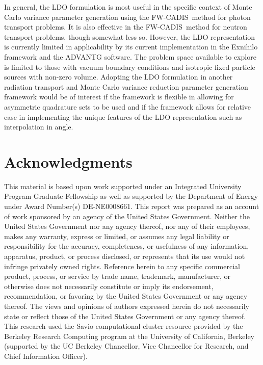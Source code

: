 \documentclass{article} %
\newcommand{\fwc}{\mbox{FW-CADIS}}
\begin{document}
In general, the LDO formulation is most useful in the specific context of
Monte Carlo variance parameter generation using the \fwc\ method for photon
transport problems. It is also effective in the \fwc\ method for neutron
transport problems, though somewhat less so. However, the LDO representation
is currently limited in applicability by its current implementation in the
Exnihilo framework and the ADVANTG software. The problem space available to
explore is limited to those with vacuum boundary conditions and isotropic
fixed particle sources with non-zero volume. Adopting the LDO formulation in
another radiation transport and Monte Carlo variance reduction parameter
generation framework would be of interest if the framework is flexible in
allowing for asymmetric quadrature sets to be used and if the framework allows
for relative ease in implementing the unique features of the LDO
representation such as interpolation in angle.

\pagebreak
\section*{Acknowledgments}

This material is based upon work supported under an Integrated
University Program Graduate Fellowship as well as supported by the Department 
of Energy under Award Number(s) DE-NE0008661. This report was prepared as an
account of work sponsored by an agency of the United States Government.
Neither the United States Government nor any agency thereof, nor any of their
employees, makes any warranty, express or limited, or assumes any legal
liability or responsibility for the accuracy, completeness, or usefulness of
any information, apparatus, product, or process disclosed, or represents that
its use would not infringe privately owned rights. Reference herein to any 
specific commercial product, process, or service by trade name, trademark, 
manufacturer, or otherwise does not necessarily constitute or imply its 
endorsement, recommendation, or favoring by the United States Government or
any agency thereof. The views and opinions of authors expressed herein do not 
necessarily state or reflect those of the United States Government or any 
agency thereof. This research used the Savio computational cluster resource 
provided by the Berkeley Research Computing program at the University of 
California, Berkeley (supported by the UC Berkeley Chancellor, Vice Chancellor
for Research, and Chief Information Officer).

\pagebreak



\end{document}
